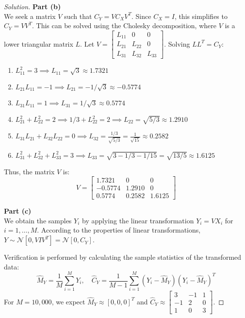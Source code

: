 \documentclass{article}
\begin{document}
\begin{proof}[Solution]
    \textbf{Part (b)}\\
    We seek a matrix $V$ such that $C_Y = V C_X V^T$. Since $C_X = I$, this simplifies to $C_Y = V V^T$. This can be solved using the Cholesky decomposition, where $V$ is a lower triangular matrix $L$.
    Let $V = \begin{bmatrix} L_{11} & 0 & 0 \\ L_{21} & L_{22} & 0 \\ L_{31} & L_{32} & L_{33} \end{bmatrix}$. Solving $L L^T = C_Y$:
    \begin{enumerate}
        \item $L_{11}^2 = 3 \implies L_{11} = \sqrt{3} \approx 1.7321$
        \item $L_{21} L_{11} = -1 \implies L_{21} = -1/\sqrt{3} \approx -0.5774$
        \item $L_{31} L_{11} = 1 \implies L_{31} = 1/\sqrt{3} \approx 0.5774$
        \item $L_{21}^2 + L_{22}^2 = 2 \implies 1/3 + L_{22}^2 = 2 \implies L_{22} = \sqrt{5/3} \approx 1.2910$
        \item $L_{31} L_{21} + L_{32} L_{22} = 0 \implies L_{32} = \frac{1/3}{\sqrt{5/3}} = \frac{1}{\sqrt{15}} \approx 0.2582$
        \item $L_{31}^2 + L_{32}^2 + L_{33}^2 = 3 \implies L_{33} = \sqrt{3 - 1/3 - 1/15} = \sqrt{13/5} \approx 1.6125$
    \end{enumerate}
    Thus, the matrix $V$ is:
    \[ V = \begin{bmatrix} 1.7321 & 0 & 0 \\ -0.5774 & 1.2910 & 0 \\ 0.5774 & 0.2582 & 1.6125 \end{bmatrix} \]
    
    \textbf{Part (c)}\\
    We obtain the samples $Y_i$ by applying the linear transformation $Y_i = V X_i$ for $i = 1, \dots, M$. According to the properties of linear transformations, $Y \sim \mathcal{N}[0, V I V^T] = \mathcal{N}[0, C_Y]$.
    
    Verification is performed by calculating the sample statistics of the transformed data:
    \[ \hat{M}_Y = \frac{1}{M} \sum_{i=1}^{M} Y_i, \quad \hat{C}_Y = \frac{1}{M-1} \sum_{i=1}^{M} (Y_i - \hat{M}_Y)(Y_i - \hat{M}_Y)^T \]
    For $M = 10,000$, we expect $\hat{M}_Y \approx [0, 0, 0]^T$ and $\hat{C}_Y \approx \begin{bmatrix} 3 & -1 & 1 \\ -1 & 2 & 0 \\ 1 & 0 & 3 \end{bmatrix}$.


\end{proof}
\end{document}
